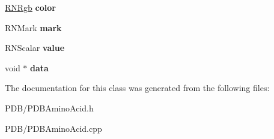 \begin{DoxyCompactItemize}
\item 
\hyperlink{class_r_n_rgb}{R\+N\+Rgb} {\bfseries color}\hypertarget{class_p_d_b_amino_acid_a74b290fc5db3d3580b5c03320e62099f}{}\label{class_p_d_b_amino_acid_a74b290fc5db3d3580b5c03320e62099f}

\item 
R\+N\+Mark {\bfseries mark}\hypertarget{class_p_d_b_amino_acid_aec0f01bf99e571e2c550e41c39937a51}{}\label{class_p_d_b_amino_acid_aec0f01bf99e571e2c550e41c39937a51}

\item 
R\+N\+Scalar {\bfseries value}\hypertarget{class_p_d_b_amino_acid_a1ef1dbc2a72b0955e18de10bc5fab8bb}{}\label{class_p_d_b_amino_acid_a1ef1dbc2a72b0955e18de10bc5fab8bb}

\item 
void $\ast$ {\bfseries data}\hypertarget{class_p_d_b_amino_acid_a7b2ffa11fb02bb5b76e996aba1da45bd}{}\label{class_p_d_b_amino_acid_a7b2ffa11fb02bb5b76e996aba1da45bd}

\end{DoxyCompactItemize}


The documentation for this class was generated from the following files\+:\begin{DoxyCompactItemize}
\item 
P\+D\+B/P\+D\+B\+Amino\+Acid.\+h\item 
P\+D\+B/P\+D\+B\+Amino\+Acid.\+cpp\end{DoxyCompactItemize}
